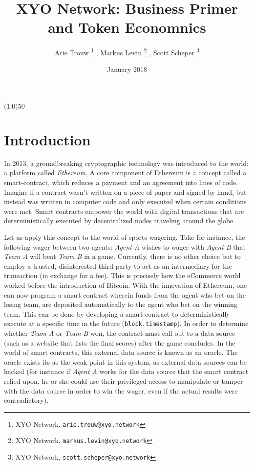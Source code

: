 \documentclass{article}
\title {XYO Network: Business Primer and Token Economnics}
\author{
    Arie Trouw
        \thanks{XYO Network, \texttt{arie.trouw@xyo.network}}
    , Markus Levin
        \thanks{XYO Network, \texttt{markus.levin@xyo.network}}
    , Scott Scheper
        \thanks{XYO Network, \texttt{scott.scheper@xyo.network}}
}
\date{January 2018}
\begin{document}
\pagecolor{lightgreen}

\maketitle

\begin{center}
\line(1,0){50}
\end{center}

\section{Introduction}
In 2013, a groundbreaking cryptographic technology was introduced to the world: a platform called \textit{Ethereum}. A core component of Ethereum is a concept called a \gls{smart-contract}, which reduces a payment and an agreement into lines of code. Imagine if a contract wasn't written on a piece of paper and signed by hand, but instead was written in computer code and only executed when certain conditions were met. Smart contracts empower the world with digital transactions that are deterministically executed by decentralized nodes traveling around the globe.

Let us apply this concept to the world of sports wagering. Take for instance, the following wager between two agents: \textit{Agent A} wishes to wager with \textit{Agent B} that \textit{Team A} will beat \textit{Team B} in a game. Currently, there is no other choice but to employ a trusted, disinterested third party to act as an intermediary for the transaction (in exchange for a fee). This is precisely how the eCommerce world worked before the introduction of Bitcoin. With the innovation of Ethereum, one can now program a smart contract wherein funds from the agent who bet on the losing team, are deposited automatically to the agent who bet on the winning team. This can be done by developing a smart contract to deterministically execute at a specific time in the future (\texttt{block.timestamp}). In order to determine whether \textit{Team A} or \textit{Team B} won, the contract must call out to a data source (such as a website that lists the final scores) after the game concludes. In the world of smart contracts, this external data source is known as an \gls{oracle}. The oracle exists its as the weak point in this system, as external data sources can be hacked (for instance if \textit{Agent A} works for the data source that the smart contract relied upon, he or she could use their privileged access to manipulate or tamper with the data source in order to win the wager, even if the actual results were contradictory).
\end{document}

